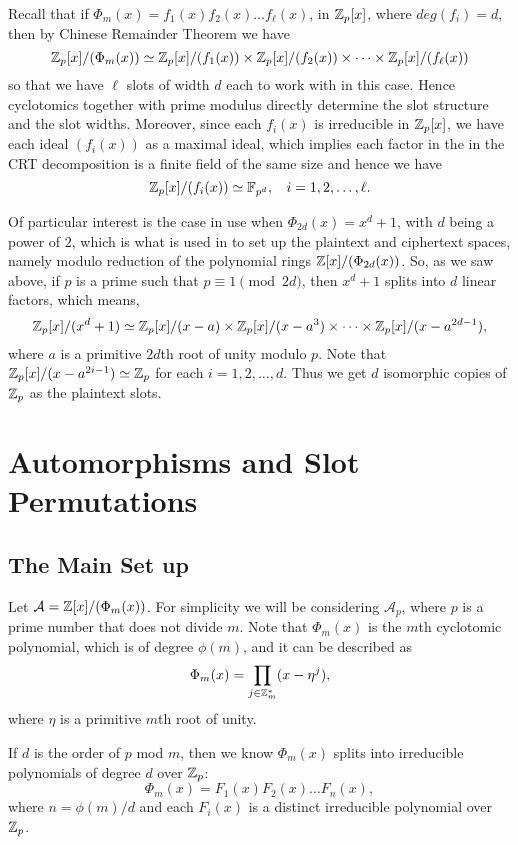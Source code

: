 \documentclass[12pt]{article}
\theoremstyle{plain}
\theoremstyle{definition}
\theoremstyle{remark}
\begin{document}
Recall that if $\Phi_m(x) = f_1(x)f_2(x)\dots f_{\ell}(x)$, in $\mathbb{Z}_p[x]$, where $deg(f_i)=d$, then by Chinese Remainder Theorem we have
$$\mathbb{Z}_p[x]/(\Phi_m(x)) \simeq \mathbb{Z}_p[x]/(f_1(x))\times \mathbb{Z}_p[x]/(f_2(x)) \times \dots \times \mathbb{Z}_p[x]/(f_{\ell}(x))$$ so that we have $\ell$ slots of width $d$ each to work with in this case. Hence cyclotomics together with prime modulus directly determine the slot structure and the slot widths. Moreover, since each $f_i(x)$ is irreducible in $\mathbb{Z}_p[x]$, we have each ideal $(f_i(x))$ as a maximal ideal, which implies each factor in the in the CRT decomposition is a finite field of the same size and hence we have
$$\mathbb{Z}_p[x]/(f_i(x)) \simeq \mathbb{F}_{p^d}, \:\:\:\: i=1, 2, \dots, \ell.$$

Of particular interest is the case in use when $\Phi_{2d}(x)=x^d+1$, with $d$ being a power of $2$, which is what is used in \cite{GHS} to set up the plaintext and ciphertext spaces, namely modulo reduction of the polynomial rings $\mathbb{Z}[x]/(\Phi_{2d}(x))$. So, as we saw above, if $p$ is a prime such that $p\equiv 1 \pmod{2d}$, then $x^d+1$ splits into $d$ linear factors, which means,
$$\mathbb{Z}_p[x]/(x^d+1) \simeq \mathbb{Z}_p[x]/(x-a)\times \mathbb{Z}_p[x]/(x-a^3)\times \dots \times\mathbb{Z}_p[x]/(x-a^{2d-1}),$$
where $a$ is a primitive $2d$th root of unity modulo $p$. Note that $\mathbb{Z}_p[x]/(x-a^{2i-1})\simeq \mathbb{Z}_p$ for each $i=1,2, \dots, d$. Thus we get $d$ isomorphic copies of $\mathbb{Z}_p$ as the plaintext slots.

\section{Automorphisms and Slot Permutations}
\subsection{The Main Set up}
Let $\mathcal{A} = \mathbb{Z}[x]/(\Phi_m(x))$. For simplicity we will be considering $\mathcal{A}_p$, where $p$ is a prime number that does not divide $m$. Note that $\Phi_m(x)$ is the $m$th cyclotomic polynomial, which is of degree $\phi(m)$, and it can be described as
$$\Phi_m(x) = \prod_{j\in\mathbb{Z}_m^*}(x-\eta^j),$$
where $\eta$ is a primitive $m$th root of unity.

If $d$ is the order of $p$ mod $m$, then we know $\Phi_m(x)$ splits into irreducible polynomials of degree $d$ over $\mathbb{Z}_p$:
$$\Phi_m(x) = F_1(x)F_2(x)\dots F_n(x),$$
where $n=\phi(m)/d$ and each $F_i(x)$ is a distinct irreducible polynomial over $\mathbb{Z}_p$.
\end{document}
